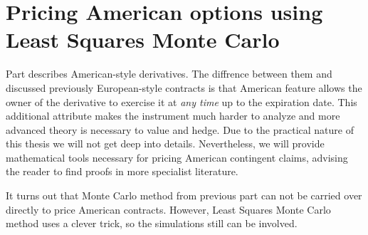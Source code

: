 \documentclass[a4paper,12pt, oneside]{book}
\theoremstyle{definition}
\theoremstyle{remark}
\begin{document}
\chapter[{Pricing American options using Least Squares Monte Carlo}]{Pricing American options using \\Least Squares Monte Carlo}
\label{chapter:pricingAmerican}
Part  describes American-style derivatives. The diffrence between them and discussed previously European-style contracts is that American feature allows the owner of the derivative to exercise it at \emph{any time} up to the expiration date. This additional attribute makes the instrument much harder to analyze and more advanced theory is necessary to value and hedge. Due to the practical nature of this thesis we will not get deep into details. Nevertheless, we will provide mathematical tools necessary for pricing American contingent claims, advising the reader to find proofs in more specialist literature. 

It turns out that Monte Carlo method from previous part can not be carried over directly to price American contracts. However, Least Squares Monte Carlo method uses a clever trick, so the simulations still can be involved. 
\end{document}
